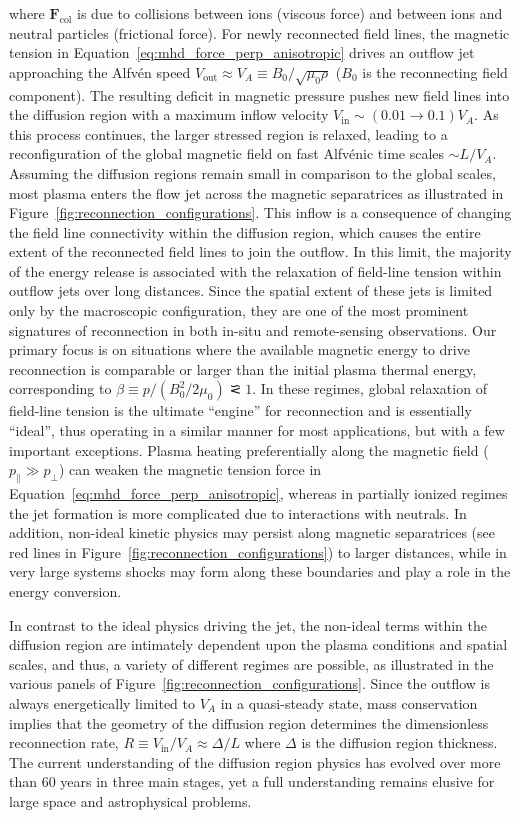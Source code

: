 \documentclass[
  notoc %
]{tufte-book}
\begin{document}
where \(\mathbf{F}_\text{col}\) is due to collisions between ions
(viscous force) and between ions and neutral particles (frictional
force). For newly reconnected field lines, the magnetic tension in
Equation~\ref{eq:mhd_force_perp_anisotropic} drives an outflow jet
approaching the Alfvén speed
\(V_\text{out} \approx V_A \equiv B_0/\sqrt{\mu_0 \rho}\) (\(B_0\) is
the reconnecting field component). The resulting deficit in magnetic
pressure pushes new field lines into the diffusion region with a maximum
inflow velocity \(V_\text{in}\sim (0.01 \rightarrow 0.1) V_A\). As this
process continues, the larger stressed region is relaxed, leading to a
reconfiguration of the global magnetic field on fast Alfvénic time
scales \(\sim L/V_A\). Assuming the diffusion regions remain small in
comparison to the global scales, most plasma enters the flow jet across
the magnetic separatrices as illustrated in
Figure~\ref{fig:reconnection_configurations}. This inflow is a
consequence of changing the field line connectivity within the diffusion
region, which causes the entire extent of the reconnected field lines to
join the outflow. In this limit, the majority of the energy release is
associated with the relaxation of field-line tension within outflow jets
over long distances. Since the spatial extent of these jets is limited
only by the macroscopic configuration, they are one of the most
prominent signatures of reconnection in both in-situ and remote-sensing
observations. Our primary focus is on situations where the available
magnetic energy to drive reconnection is comparable or larger than the
initial plasma thermal energy, corresponding to
\(\beta\equiv p/(B_0^2/2\mu_0)\simless 1\). In these regimes, global
relaxation of field-line tension is the ultimate ``engine'' for
reconnection and is essentially ``ideal'', thus operating in a similar
manner for most applications, but with a few important exceptions.
Plasma heating preferentially along the magnetic field
(\(p_\parallel\gg p_\perp\)) can weaken the magnetic tension force in
Equation~\ref{eq:mhd_force_perp_anisotropic}, whereas in partially
ionized regimes the jet formation is more complicated due to
interactions with neutrals. In addition, non-ideal kinetic physics may
persist along magnetic separatrices (see red lines in
Figure~\ref{fig:reconnection_configurations}) to larger distances, while
in very large systems shocks may form along these boundaries and play a
role in the energy conversion.

In contrast to the ideal physics driving the jet, the non-ideal terms
within the diffusion region are intimately dependent upon the plasma
conditions and spatial scales, and thus, a variety of different regimes
are possible, as illustrated in the various panels of
Figure~\ref{fig:reconnection_configurations}. Since the outflow is
always energetically limited to \(V_A\) in a quasi-steady state, mass
conservation implies that the geometry of the diffusion region
determines the dimensionless reconnection rate,
\(R \equiv V_\text{in}/V_A \approx \Delta/L\) where \(\Delta\) is the
diffusion region thickness. The current understanding of the diffusion
region physics has evolved over more than 60 years in three main stages,
yet a full understanding remains elusive for large space and
astrophysical problems.
\end{document}
